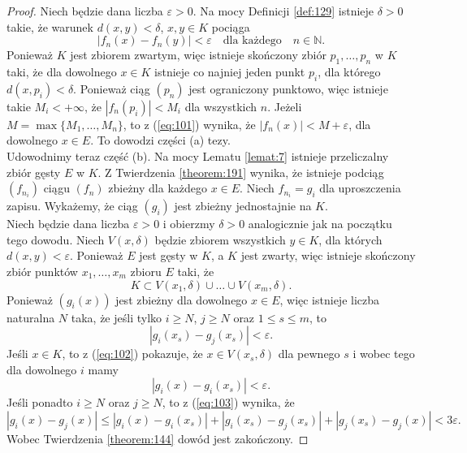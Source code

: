 \documentclass[leqno]{article}
\begin{document}
\begin{justify}
\begin{proof}
    Niech będzie dana liczba $\varepsilon > 0$. Na mocy Definicji \ref{def:129} istnieje $\delta > 0$ takie, że 
    warunek $d(x,y) < \delta$, $x, y \in K$ pociąga
    \begin{equation}\label{eq:101}
        |f_n(x) - f_n(y)| < \varepsilon \quad \text{dla każdego} \quad n \in \mathbb{N}.
    \end{equation}
    Ponieważ $K$ jest zbiorem zwartym, więc istnieje skończony zbiór $p_1, \ldots, p_n$ w $K$ taki, że 
    dla dowolnego $x \in K$ istnieje co najniej jeden punkt $p_i$, dla którego $d(x, p_i) < \delta$.
    Ponieważ ciąg $(p_n)$ jest ograniczony punktowo, więc istnieje takie $M_i < +\infty$, że $|f_n(p_i)| < M_i$ dla 
    wszystkich $n$. Jeżeli $M = \max\{M_1, \ldots, M_n\}$, to z (\ref{eq:101}) wynika, że $|f_n(x)|< M + \varepsilon$, dla
    dowolnego $x \in E$. To dowodzi części (a) tezy. \\
    Udowodnimy teraz część (b). Na mocy Lematu \ref{lemat:7} istnieje przeliczalny zbiór gęsty $E$ w $K$. Z Twierdzenia 
    \ref{theorem:191} wynika, że istnieje podciąg $(f_{n_i})$ ciągu $(f_n)$ zbieżny dla każdego $x \in E$. Niech $f_{n_i} = g_i$ dla uproszczenia zapisu.
    Wykażemy, że ciąg $(g_i)$ jest zbieżny jednostajnie na $K$. \\
    Niech będzie dana liczba $\varepsilon > 0$ i obierzmy $\delta > 0$ analogicznie jak na początku tego dowodu. Niech $V(x, \delta)$ będzie zbiorem wszystkich $y \in K$, 
    dla których $d(x, y) < \varepsilon$. Ponieważ $E$ jest gęsty w $K$, a $K$ jest zwarty, więc istnieje skończony zbiór punktów $x_1, \ldots, x_m$ zbioru $E$ taki, że 
    \begin{equation}\label{eq:102}
        K \subset V(x_1, \delta) \cup \ldots \cup V(x_m, \delta).
    \end{equation}
    Ponieważ $(g_i(x))$ jest zbieżny dla dowolnego $x \in E$, więc istnieje liczba naturalna $N$ taka, że jeśli tylko $i \geqslant N$, $j \geqslant N$ oraz $1 \leqslant s \leqslant m$, to
    \begin{equation}\label{eq:103}
        |g_i(x_s) - g_j(x_s)| < \varepsilon.
    \end{equation}
    Jeśli $x \in K$, to z (\ref{eq:102}) pokazuje, że $x \in V(x_s, \delta)$ dla pewnego $s$ i wobec tego dla dowolnego $i$ mamy
    \[
        |g_i(x) - g_i(x_s)| < \varepsilon.
    \]
    Jeśli ponadto $i \geqslant N$ oraz $j \geqslant N$, to z (\ref{eq:103}) wynika, że 
    \[
        |g_i(x) - g_j(x)| \leqslant |g_i(x) - g_i(x_s)| + |g_i(x_s) - g_j(x_s)| + |g_j(x_s) - g_j(x)| < 3\varepsilon.
    \]
    Wobec Twierdzenia \ref{theorem:144} dowód jest zakończony.
\end{proof}


\end{justify}
\end{document}
